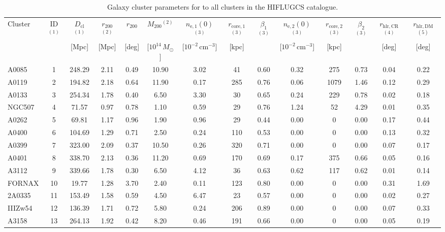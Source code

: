 \documentclass[10pt,aps,pra,reprint,amsmath,amsfonts,amssymb,showpacs,nofootinbib,floatfix]{revtex4-1}
\newcommand{\rmn}{\mathrm}
\newcommand{\clu}{\rmn{cl}}
\newcommand{\msun}{M_\odot}
\newcommand{\vst}{\vspace{-0.14mm}}
\newcommand{\rvir}{r_{200}}
\newcommand{\mvir}{M_{200}}
\begin{document}
{\begin{table}
\begin{minipage}{2.0\columnwidth}
  \caption{Galaxy cluster parameters for to all clusters in the HIFLUGCS catalogue.}
\begin{tabular}{l c c c c c c c c c c c c c}
\hline
\hline
Cluster & ID$^{(1)}$ & $D_\clu$$^{(1)}$ & $\rvir$$^{(2)}$ & $\rvir$ &
$\mvir$$^{(2)}$ & $n_\rmn{e,1}(0)$$^{(3)}$ & $r_\rmn{core,1}$$^{(3)}$ &
$\beta_1$$^{(3)}$ & $n_\rmn{e,2}(0)$$^{(3)}$ & $r_\rmn{core,2}$$^{(3)}$ &
$\beta_2$$^{(3)}$ & $r_\rmn{hlr,CR}$$^{(4)}$ & $r_\rmn{hlr,DM}$ $^{(5)}$ \\
& & [Mpc] & [Mpc] & [deg] & [$10^{14}\,\msun$]
& [$10^{-2}\,\rmn{cm}^{-3}$] & [kpc] & &
  [$10^{-2}\,\rmn{cm}^{-3}$] & [kpc] & & [deg] & [deg] \\
 \hline
A0085 & 1 & 248.29 & 2.11 & 0.49 & 10.90 & 3.02 & 41 & 0.60 & 0.32 & 275 & 0.73 & 0.04 & 0.22 \vst \\
A0119 & 2 & 194.82 & 2.18 & 0.64 & 11.90 & 0.17 & 285 & 0.76 & 0.06 & 1079 & 1.46 & 0.12 & 0.29 \vst \\
A0133 & 3 & 254.34 & 1.78 & 0.40 & 6.50 & 3.30 & 30 & 0.65 & 0.24 & 229 & 0.78 & 0.02 & 0.18 \vst \\
NGC507 & 4 & 71.57 & 0.97 & 0.78 & 1.10 & 0.59 & 29 & 0.76 & 1.24 & 52 & 4.29 & 0.01 & 0.35 \vst \\
A0262 & 5 & 69.81 & 1.17 & 0.96 & 1.90 & 0.96 & 29 & 0.44 & 0.00 & 0 & 0.00 & 0.17 & 0.44 \vst \\
A0400 & 6 & 104.69 & 1.29 & 0.71 & 2.50 & 0.24 & 110 & 0.53 & 0.00 & 0 & 0.00 & 0.13 & 0.32 \vst \\
A0399 & 7 & 323.00 & 2.09 & 0.37 & 10.50 & 0.26 & 320 & 0.71 & 0.00 & 0 & 0.00 & 0.07 & 0.17 \vst \\
A0401 & 8 & 338.70 & 2.13 & 0.36 & 11.20 & 0.69 & 170 & 0.69 & 0.17 & 375 & 0.66 & 0.05 & 0.16 \vst \\
A3112 & 9 & 339.66 & 1.78 & 0.30 & 6.50 & 4.12 & 36 & 0.63 & 0.62 & 117 & 0.62 & 0.01 & 0.14 \vst \\
FORNAX & 10 & 19.77 & 1.28 & 3.70 & 2.40 & 0.11 & 123 & 0.80 & 0.00 & 0 & 0.00 & 0.31 & 1.69 \vst \\
2A0335 & 11 & 153.49 & 1.58 & 0.59 & 4.50 & 6.47 & 23 & 0.57 & 0.00 & 0 & 0.00 & 0.02 & 0.27 \vst \\
IIIZw54 & 12 & 136.39 & 1.71 & 0.72 & 5.80 & 0.24 & 206 & 0.89 & 0.00 & 0 & 0.00 & 0.07 & 0.33 \vst \\
A3158 & 13 & 264.13 & 1.92 & 0.42 & 8.20 & 0.46 & 191 & 0.66 & 0.00 & 0 & 0.00 & 0.05 & 0.19 \vst \\

\end{tabular}
\end{minipage}
\end{table}}
\end{document}
